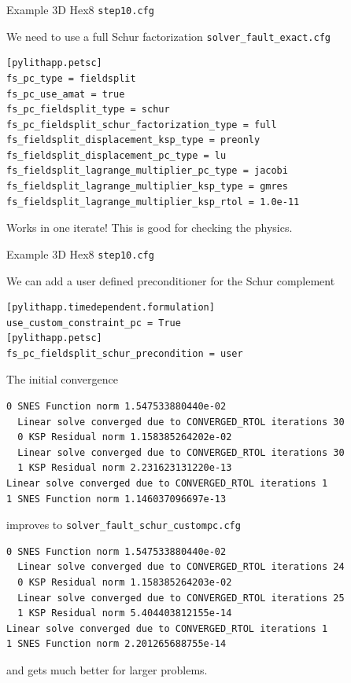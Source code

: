 \documentclass[dvipsnames]{beamer}
\begin{document}
\begin{frame}[fragile]{Example 3D Hex8 \texttt{step10.cfg}}

\begin{block}{We need to use a full Schur factorization \texttt{solver\_fault\_exact.cfg}}
\begin{verbatim}
[pylithapp.petsc]
fs_pc_type = fieldsplit
fs_pc_use_amat = true
fs_pc_fieldsplit_type = schur
fs_pc_fieldsplit_schur_factorization_type = full
fs_fieldsplit_displacement_ksp_type = preonly
fs_fieldsplit_displacement_pc_type = lu
fs_fieldsplit_lagrange_multiplier_pc_type = jacobi
fs_fieldsplit_lagrange_multiplier_ksp_type = gmres
fs_fieldsplit_lagrange_multiplier_ksp_rtol = 1.0e-11
\end{verbatim}
\end{block}
\pause
\begin{center}
  Works in one iterate! This is good for checking the physics.
\end{center}
\end{frame}
%
\begin{frame}[fragile]{Example 3D Hex8 \texttt{step10.cfg}}

\begin{block}{We can add a user defined preconditioner for the Schur complement}
\begin{verbatim}
[pylithapp.timedependent.formulation]
use_custom_constraint_pc = True
[pylithapp.petsc]
fs_pc_fieldsplit_schur_precondition = user
\end{verbatim}
\end{block}
\pause
\begin{overprint}
\begin{block}{The initial convergence}\scriptsize
\begin{verbatim}
0 SNES Function norm 1.547533880440e-02 
  Linear solve converged due to CONVERGED_RTOL iterations 30
  0 KSP Residual norm 1.158385264202e-02 
  Linear solve converged due to CONVERGED_RTOL iterations 30
  1 KSP Residual norm 2.231623131220e-13 
Linear solve converged due to CONVERGED_RTOL iterations 1
1 SNES Function norm 1.146037096697e-13 
\end{verbatim}
\end{block}
\begin{block}{improves to \texttt{solver\_fault\_schur\_custompc.cfg}}{\scriptsize
\begin{verbatim}
0 SNES Function norm 1.547533880440e-02 
  Linear solve converged due to CONVERGED_RTOL iterations 24
  0 KSP Residual norm 1.158385264203e-02 
  Linear solve converged due to CONVERGED_RTOL iterations 25
  1 KSP Residual norm 5.404403812155e-14 
Linear solve converged due to CONVERGED_RTOL iterations 1
1 SNES Function norm 2.201265688755e-14 
\end{verbatim}}
and gets much better for larger problems.
\end{block}
\end{overprint}
\end{frame}
\end{document}
